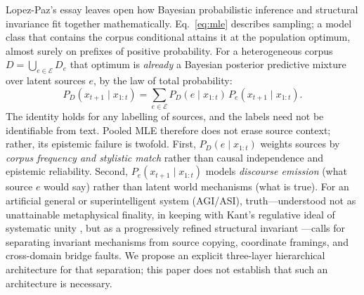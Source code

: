 \documentclass[11pt,a4paper]{article}
\theoremstyle{definition}
\theoremstyle{remark}
\begin{document}
Lopez-Paz's essay leaves open how Bayesian probabilistic inference and structural invariance fit together mathematically. Eq.~\eqref{eq:mle} describes sampling; a model class that contains the corpus conditional attains it at the population optimum, almost surely on prefixes of positive probability. For a heterogeneous corpus $D = \bigcup_{e \in \mathcal{E}} D_e$ that optimum is \emph{already} a Bayesian posterior predictive mixture over latent sources $e$, by the law of total probability:
\begin{equation}
  P_D(x_{t+1} \mid x_{1:t}) = \sum_{e \in \mathcal{E}} P_D(e \mid x_{1:t}) \, P_e(x_{t+1} \mid x_{1:t}).
  \label{eq:mixture_mle}
\end{equation}
The identity holds for any labelling of sources, and the labels need not be identifiable from text. Pooled MLE therefore does not erase source context; rather, its epistemic failure is twofold. First, $P_D(e \mid x_{1:t})$ weights sources by \emph{corpus frequency and stylistic match} rather than causal independence and epistemic reliability. Second, $P_e(x_{t+1} \mid x_{1:t})$ models \emph{discourse emission} (what source $e$ would say) rather than latent world mechanisms (what is true). For an artificial general or superintelligent system (AGI/ASI), truth---understood not as unattainable metaphysical finality, in keeping with Kant's regulative ideal of systematic unity \cite{kant1781critique}, but as a progressively refined structural invariant \cite{nagel1986view,nozick2001invariances}---calls for separating invariant mechanisms from source copying, coordinate framings, and cross-domain bridge faults. We propose an explicit three-layer hierarchical architecture for that separation; this paper does not establish that such an architecture is necessary.
\end{document}

